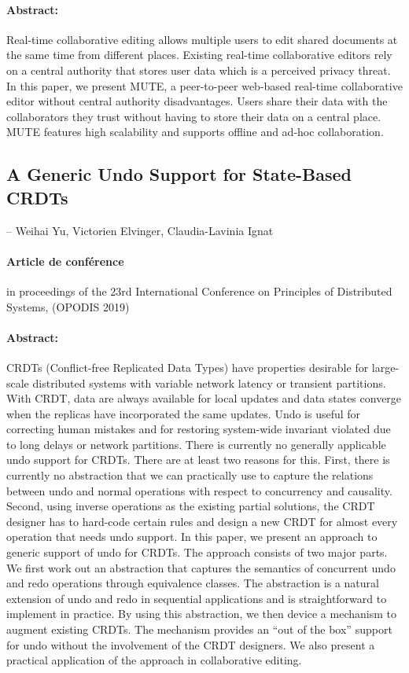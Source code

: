 \paragraph{Abstract:} Real-time collaborative editing allows multiple users to edit shared documents at the same time from different places. Existing real-time collaborative editors rely on a central authority that stores user data which is a perceived privacy threat. In this paper, we present \acf{MUTE}, a peer-to-peer web-based real-time collaborative editor without central authority disadvantages. Users share their data with the collaborators they trust without having to store their data on a central place. MUTE features high scalability and supports offline and ad-hoc collaboration.

\clearpage

\subsection*{A Generic Undo Support for State-Based CRDTs \autocite{2019_yu_genericundo}}

-- Weihai Yu, Victorien Elvinger, Claudia-Lavinia Ignat

\paragraph{Article de conférence} in proceedings of the 23rd International Conference on Principles of Distributed Systems, ({OPODIS} 2019)

\paragraph{Abstract:} CRDTs (Conflict-free Replicated Data Types) have properties desirable for large-scale distributed systems with variable network latency or transient partitions.
With CRDT, data are always available for local updates and data states converge when the replicas have incorporated the same updates.
Undo is useful for correcting human mistakes and for restoring system-wide invariant violated due to long delays or network partitions.
There is currently no generally applicable undo support for CRDTs.
There are at least two reasons for this. First, there is currently no abstraction that we can practically use to capture the relations between undo and normal operations with respect to concurrency and causality. 
Second, using inverse operations as the existing partial solutions, the CRDT designer has to hard-code certain rules and design a new CRDT for almost every operation that needs undo support.
In this paper, we present an approach to generic support of undo for CRDTs. The approach consists of two major parts.
We first work out an abstraction that captures the semantics of concurrent undo and redo operations through equivalence classes.
The abstraction is a natural extension of undo and redo in sequential applications and is straightforward to implement in practice.
By using this abstraction, we then device a mechanism to augment existing CRDTs.
The mechanism provides an ``out of the box'' support for undo without the involvement of the CRDT designers.
We also present a practical application of the approach in collaborative editing.



